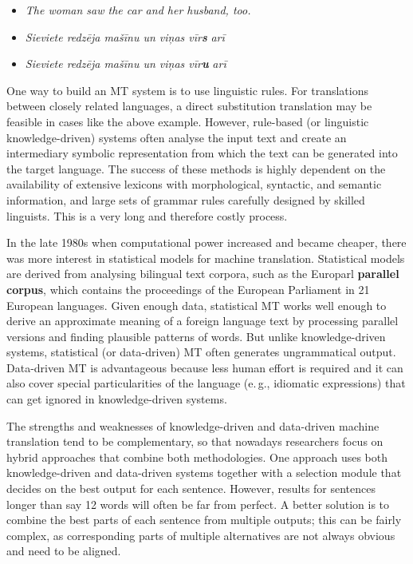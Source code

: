 \begin{multicols}{2}
\begin{itemize}
\item[] \textit{The woman saw the car and her husband, too.}
\item \textit{Sieviete redzēja mašīnu un viņas vīr}\textbf{\textit{s}}\textit{ arī}
\item \textit{Sieviete redzēja mašīnu un viņas vīr}\textbf{\textit{u}}\textit{ arī}
\end{itemize}

One way to build an MT system is to use linguistic rules.  For translations between closely related languages, a direct substitution translation may be feasible in cases like the above example.  However, rule-based (or linguistic knowledge-driven) systems often analyse the input text and create an intermediary symbolic representation from which the text can be generated into the target language.  The success of these methods is highly dependent on the availability of extensive lexicons with morphological, syntactic, and semantic information, and large sets of grammar rules carefully designed by skilled linguists.  This is a very long and therefore costly process.

In the late 1980s when computational power increased and became cheaper, there was more interest in statistical models for machine translation.  Statistical models are derived from analysing bilingual text corpora, such as the Europarl \textbf{parallel corpus}, which contains the proceedings of the European Parliament in 21 European languages.  Given enough data, statistical MT works well enough to derive an approximate meaning of a foreign language text by processing parallel versions and finding plausible patterns of words.  But unlike knowledge-driven systems, statistical (or data-driven) MT often generates ungrammatical output.  Data-driven MT is advantageous because less human effort is required and it can also cover special particularities of the language (e.\,g., idiomatic expressions) that can get ignored in knowledge-driven systems.


The strengths and weaknesses of knowledge-driven and data-driven machine translation tend to be complementary, so that nowadays researchers focus on hybrid approaches that combine both methodologies.  One approach uses both knowledge-driven and data-driven systems together with a selection module that decides on the best output for each sentence.  However, results for sentences longer than say 12 words will often be far from perfect.  A better solution is to combine the best parts of each sentence from multiple outputs; this can be fairly complex, as corresponding parts of multiple alternatives are not always obvious and need to be aligned.


\end{multicols}

